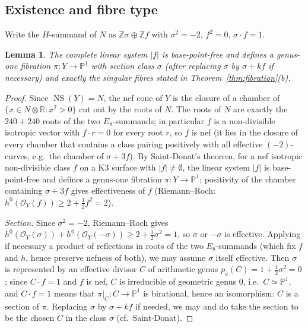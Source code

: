 \documentclass[11pt]{article}
\newtheorem{lemma}[theorem]{Lemma}
\newcommand{\PP}{\mathbb{P}}
\newcommand{\bZ}{\mathbb{Z}}
\newcommand{\bR}{\mathbb{R}}
\DeclareMathOperator{\NS}{NS}
\begin{document}
\subsection{Existence and fibre type}

Write the $H$-summand of $N$ as $\bZ\sigma\oplus\bZ f$ with
$\sigma^2=-2$, $f^2=0$, $\sigma\cdot f=1$.

\begin{lemma}\label{lem:fibration}
The complete linear system $|f|$ is base-point-free and defines a genus-one
fibration $\pi\colon Y\to\PP^1$ with section class $\sigma$ (after replacing
$\sigma$ by $\sigma+kf$ if necessary) and exactly the singular fibres stated
in Theorem~\ref{thm:fibration}(b).
\end{lemma}

\begin{proof}
Since $\NS(Y)=N$, the nef cone of $Y$ is the closure of a chamber of
$\{x\in N\otimes\bR : x^2>0\}$ cut out by the roots of $N$. The roots of $N$
are exactly the $240+240$ roots of the two $E_8$-summands; in particular $f$
is a non-divisible isotropic vector with $f\cdot r=0$ for every root $r$, so
$f$ is nef (it lies in the closure of every chamber that contains a class
pairing positively with all effective $(-2)$-curves, e.g.\ the chamber of
$\sigma+3f$). By Saint-Donat's theorem, for a nef isotropic non-divisible
class $f$ on a K3 surface with $|f|\neq\emptyset$, the linear system $|f|$
is base-point-free and defines a genus-one fibration
$\pi\colon Y\to\PP^1$; positivity of the chamber containing $\sigma+3f$
gives effectiveness of $f$ (Riemann--Roch: $h^0(\mathcal O_Y(f))\ge
2+\tfrac12 f^2=2$).

\emph{Section.} Since $\sigma^2=-2$, Riemann--Roch gives
$h^0(\mathcal O_Y(\sigma))+h^0(\mathcal O_Y(-\sigma))\ge
2+\tfrac12\sigma^2=1$, so $\sigma$ or $-\sigma$ is effective. Applying if
necessary a product of reflections in roots of the two $E_8$-summands
(which fix $f$ and $h$, hence preserve nefness of both), we may assume
$\sigma$ itself effective. Then $\sigma$ is represented by an effective
divisor $C$ of arithmetic genus $p_a(C)=1+\frac12\sigma^2=0$; since
$C\cdot f=1$ and $f$ is nef, $C$ is irreducible of geometric genus $0$,
i.e.\ $C\simeq\PP^1$, and $C\cdot f=1$ means that $\pi|_C\colon C\to\PP^1$
is birational, hence an isomorphism: $C$ is a section of $\pi$. Replacing
$\sigma$ by $\sigma+kf$ if needed, we may and do take the section to be the
chosen $C$ in the class $\sigma$ (cf.\ Saint-Donat).


\end{proof}
\end{document}
